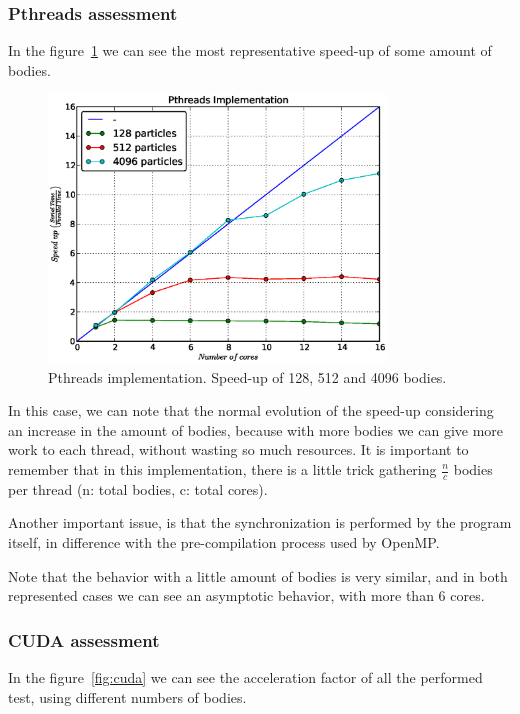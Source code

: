 \subsubsection{Pthreads assessment}

In the figure~\ref{fig:pthread} we can see the most representative speed-up of some
amount of bodies.

\begin{figure}[h!t]
    \centering
    \includegraphics[width=0.8\textwidth]{images/pthreads.eps}
    \caption{Pthreads implementation. Speed-up of 128, 512 and 4096 bodies.}
    \label{fig:pthread}
\end{figure}

In this case, we can note that the normal evolution of the speed-up
considering an increase in the amount of bodies, because with more bodies
we can give more work to each thread, without wasting so much resources.
It is important to remember that in this implementation, there is a little trick
gathering $\frac{n}{c}$ bodies per thread (n: total bodies, c: total cores).

Another important issue, is that the synchronization is performed by the program
itself, in difference with the pre-compilation process used by OpenMP.

Note that the behavior with a little amount of bodies is very similar,
and in both represented cases we can see an asymptotic behavior,
with more than 6 cores.

\subsubsection{CUDA assessment}

In the figure~\ref{fig:cuda} we can see the acceleration factor of all
the performed test, using different numbers of bodies.


